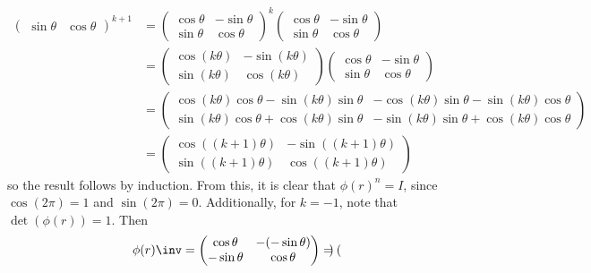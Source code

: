 \begin{problems}
\begin{solalph}
\begin{align*}
\begin{pmatrix}
                \sin\theta & \cos\theta
            \end{pmatrix}^{k + 1} & = 
            \begin{pmatrix}
                \cos\theta & -\sin\theta \\
                \sin\theta & \cos\theta
            \end{pmatrix}^k 
            \begin{pmatrix}
                \cos\theta & -\sin\theta \\
                \sin\theta & \cos\theta
            \end{pmatrix} \\
            & = 
            \begin{pmatrix}
                \cos(k\theta) & -\sin(k\theta) \\
                \sin(k\theta) & \cos(k\theta)
            \end{pmatrix}
            \begin{pmatrix}
                \cos\theta & -\sin\theta \\
                \sin\theta & \cos\theta
            \end{pmatrix} \\
            & = 
            \begin{pmatrix}
                \cos(k\theta)\cos\theta - \sin(k\theta)\sin\theta & -\cos(k\theta)\sin\theta - \sin(k\theta)\cos\theta \\
                \sin(k\theta)\cos\theta + \cos(k\theta)\sin\theta & -\sin(k\theta)\sin\theta + \cos(k\theta)\cos\theta 
            \end{pmatrix} \\
            & = 
            \begin{pmatrix}
                \cos((k + 1)\theta) & -\sin((k + 1)\theta) \\
                \sin((k + 1)\theta) & \cos((k + 1)\theta)
            \end{pmatrix}
        \end{align*}
        so the result follows by induction. From this, it is clear that $\phi(r)^n = I$, since $\cos(2\pi) = 1$ and $\sin(2\pi) = 0$. Additionally, for $k = -1$, note that $\det(\phi(r)) = 1$. Then
        \[
        \phi(r)\inv = 
        \begin{pmatrix}
            \cos\theta & -(-\sin\theta) \\
            -\sin\theta & \cos\theta
        \end{pmatrix} = 
        \begin{pmatrix}

\end{pmatrix}\]
\end{solalph}
\end{problems}
